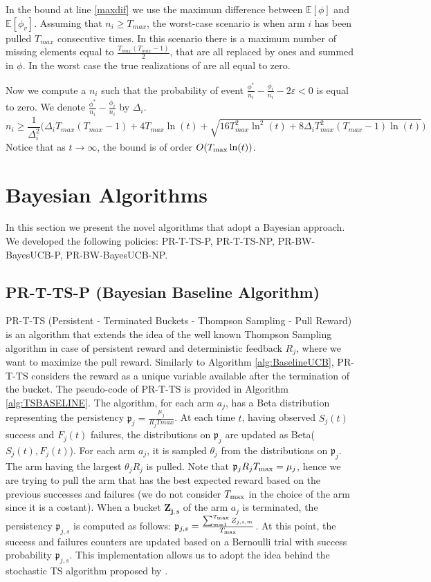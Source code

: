 In the bound at line \ref{maxdif} we use the maximum difference between $\mathbb{E}[\phi]$ and $\mathbb{E}[\phi_v]$. Assuming that $n_i \ge T_{max}$, the worst-case scenario is when arm $i$ has been pulled $T_{max}$ consecutive times. In this scenario there is a maximum number of missing elements equal to $\frac{T_{max}(T_{max}-1)}{2}$, that are all replaced by ones and summed in $\phi$. In the worst case the true realizations of are all equal to zero.

Now we compute a $n_i$ such that the probability of event $\frac{\phi^*}{n_i}-\frac{\phi_i}{n_i}-2\varepsilon <0$ is equal to zero. We denote $\frac{\phi^*}{n_i}-\frac{\phi_i}{n_i}$ by $\Delta_i$.
\[ n_i \ge \frac{1}{\Delta_i^2} \Bigg( \Delta_i T_{max}(T_{max}-1) + 4 T_{max} \ln(t) + \sqrt{16 T_{max}^2 \ln^2(t) + 8 \Delta_i T^2_{max}(T_{max}-1)\ln(t)} \Bigg)
\]
Notice that as $t \rightarrow \infty$, the bound is of order $O(T_{\textnormal{max}}\ln(t))$.




\section{Bayesian Algorithms}
In this section we present the novel algorithms that adopt a Bayesian approach. We developed the following policies: PR-T-TS-P, PR-T-TS-NP, PR-BW-BayesUCB-P, PR-BW-BayesUCB-NP.
\subsection{PR-T-TS-P (Bayesian Baseline Algorithm)}
PR-T-TS (Persistent - Terminated Buckets - Thompson Sampling - Pull Reward) is an algorithm that extends the idea of the well known Thompson Sampling algorithm in case of persistent reward and deterministic feedback $R_j$, where we want to maximize the pull reward. Similarly to Algorithm \ref{alg:BaselineUCB}, PR-T-TS considers the reward as a unique variable available after the termination of the bucket. The pseudo-code of PR-T-TS is provided in Algorithm \ref{alg:TSBASELINE}. The algorithm, for each arm $a_j$, has a Beta distribution representing the persistency $\mathfrak{p}_j=\frac{\mu_j}{R_jTmax}$. At each time $t$, having observed $S_j(t)$ success and $F_j(t)$ failures, the distributions on $\mathfrak{p}_j$ are updated as Beta($S_j(t),F_j(t)$). For each arm $a_j$, it is sampled $\theta_j$ from the distributions on $\mathfrak{p}_j$. The arm having the largest $\theta_jR_j$  is pulled. Note that $\mathfrak{p}_jR_jT_{\textnormal{max}} = \mu_j$, hence we are trying to pull the arm that has the best expected reward based on the previous successes and failures (we do not consider $T_{\textnormal{max}}$ in the choice of the arm since it is a costant). When a bucket $\boldsymbol{Z_{j,s}}$ of the arm $a_j$ is terminated, the persistency $\mathfrak{p}_{j,s}$ is computed as follows: $\mathfrak{p}_{j,s} = \frac{\sum_{m=1}^{T_{\textnormal{max}}} Z_{j,s,m}}{T_{\textnormal{max}}}$. At this point, the success and failures counters are updated based on a Bernoulli trial with success probability $\mathfrak{p}_{j,s}$. This implementation allows us to adopt the idea behind the stochastic TS algorithm proposed by \cite{agrawal2012analysis}.

